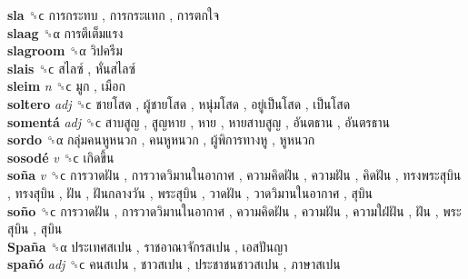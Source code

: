\textbf{sla} ␝ϲ   การกระทบ ,  การกระแทก ,  การตกใจ   \\
\textbf{slaag} ␝α   การตีเต็มแรง   \\
\textbf{slagroom} ␝α   วิปครีม   \\
\textbf{slais} ␝ϲ   สไลซ์ ,  หั่นสไลซ์   \\
\textbf{sleim} \emph{n}  ␝ϲ   มูก ,  เมือก   \\
\textbf{soltero} \emph{adj}  ␝ϲ   ชายโสด ,  ผู้ชายโสด ,  หนุ่มโสด ,  อยู่เป็นโสด ,  เป็นโสด   \\
\textbf{somentá} \emph{adj}  ␝ϲ   สาบสูญ ,  สูญหาย ,  หาย ,  หายสาบสูญ ,  อันตธาน ,  อันตรธาน   \\
\textbf{sordo} ␝α   กลุ่มคนหูหนวก ,  คนหูหนวก ,  ผู้พิการทางหู ,  หูหนวก   \\
\textbf{sosodé} \emph{v}  ␝ϲ   เกิดขึ้น   \\
\textbf{soña} \emph{v}  ␝ϲ   การวาดฝัน ,  การวาดวิมานในอากาศ ,  ความคิดฝัน ,  ความฝัน ,  คิดฝัน ,  ทรงพระสุบิน ,  ทรงสุบิน ,  ฝัน ,  ฝันกลางวัน ,  พระสุบิน ,  วาดฝัน ,  วาดวิมานในอากาศ ,  สุบิน   \\
\textbf{soño} ␝ϲ   การวาดฝัน ,  การวาดวิมานในอากาศ ,  ความคิดฝัน ,  ความฝัน ,  ความใฝ่ฝัน ,  ฝัน ,  พระสุบิน ,  สุบิน   \\
\textbf{Spaña} ␝α   ประเทศสเปน ,  ราชอาณาจักรสเปน ,  เอสปันญา   \\
\textbf{spañó} \emph{adj}  ␝ϲ   คนสเปน ,  ชาวสเปน ,  ประชาชนชาวสเปน ,  ภาษาสเปน   \\
